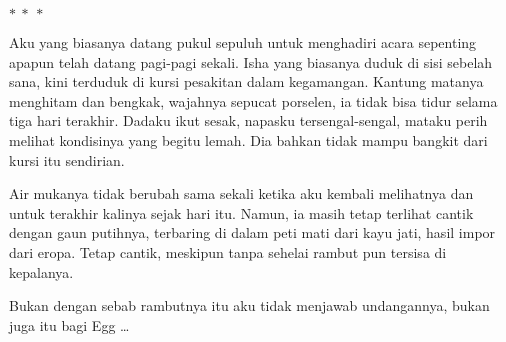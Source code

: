 \documentclass[smalldemyvopaper,11pt,twoside,onecolumn,openright,extrafontsizes]{memoir}
\newcommand\separator{
  \begin{center}
    \(\ast~\ast~\ast\)
  \end{center}
}
\begin{document}
\separator{}


Aku yang biasanya datang pukul sepuluh untuk menghadiri acara sepenting apapun telah datang pagi-pagi sekali. Isha yang biasanya duduk di sisi sebelah sana, kini terduduk di kursi pesakitan dalam kegamangan. Kantung matanya menghitam dan bengkak, wajahnya sepucat porselen, ia tidak bisa tidur selama tiga hari terakhir. Dadaku ikut sesak, napasku tersengal-sengal, mataku perih melihat kondisinya yang begitu lemah. Dia bahkan tidak mampu bangkit dari kursi itu sendirian.

Air mukanya tidak berubah sama sekali ketika aku kembali melihatnya dan untuk terakhir kalinya sejak hari itu. Namun, ia masih tetap terlihat cantik dengan gaun putihnya, terbaring di dalam peti mati dari kayu jati, hasil impor dari eropa. Tetap cantik, meskipun tanpa sehelai rambut pun tersisa di kepalanya.

Bukan dengan sebab rambutnya itu aku tidak menjawab undangannya, bukan juga itu bagi Egg \dots










\end{document}
